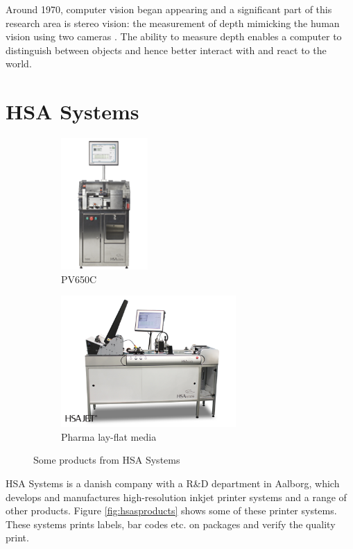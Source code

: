 Around 1970, computer vision began appearing and a significant part of this research area is stereo vision: the measurement of depth mimicking the human vision using two cameras \cite{Szeliski2010}. The ability to measure depth enables a computer to distinguish between objects and hence better interact with and react to the world.\\

\section{HSA Systems}
\begin{figure}[ht!]
  \centering
  \begin{subfigure}[t]{0.45\textwidth}
    \centering\includegraphics[height=5cm]{figures/pv650_225px}
    \caption{PV650C\cite{HSAsystems}}
    \label{fig:pv650c}
  \end{subfigure}\hspace{0.5cm}
  \begin{subfigure}[t]{0.45\textwidth}
    \centering\includegraphics[height=5cm]{figures/layflat1_big}
    \caption{Pharma lay-flat media \cite{HSAsystems}\label{fig:layflat}}
  \end{subfigure}
  \caption{Some products from HSA Systems \label{fig:hsasproducts}}
\end{figure}
HSA Systems is a danish company with a R\&D department in Aalborg, which develops and manufactures high-resolution inkjet printer systems and a range of other products. Figure \vref{fig:hsasproducts} shows some of these printer systems. These systems prints labels, bar codes etc. on packages and verify the quality print.\\

